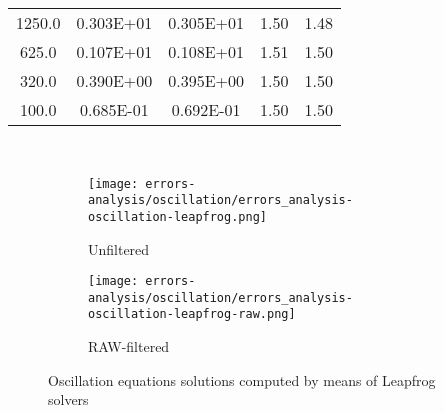 \begin{table}[!ht]
\begin{subtable}[b]{0.40\textwidth}
{\begin{tabular}{ccccc}
      1250.0          &  0.303E+01    &  0.305E+01    & 1.50          & 1.48          \\
       625.0          &  0.107E+01    &  0.108E+01    & 1.51          & 1.50          \\
       320.0          &  0.390E+00    &  0.395E+00    & 1.50          & 1.50          \\
       100.0          &  0.685E-01    &  0.692E-01    & 1.50          & 1.50          \\
      \bottomrule
    \end{tabular}}
  \end{subtable}\\
\end{table}

\begin{figure}[!ht]
  \centering
  \begin{subfigure}[b]{0.45\textwidth}
    \centering
    \texttt{[image: errors-analysis/oscillation/errors\_analysis-oscillation-leapfrog.png]}
    \caption{Unfiltered}\label{fig:results-oscillation-leapfrog-unfiltered}
  \end{subfigure}\quad%
  \begin{subfigure}[b]{0.45\textwidth}
    \centering
    \texttt{[image: errors-analysis/oscillation/errors\_analysis-oscillation-leapfrog-raw.png]}
    \caption{RAW-filtered}\label{fig:results-oscillation-leapfrog-raw}
  \end{subfigure}
  \caption{Oscillation equations solutions computed by means of Leapfrog solvers}\label{fig:results-oscillation-leapfrog}
\end{figure}

